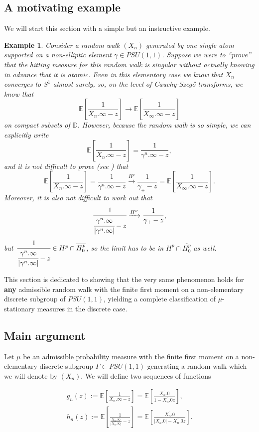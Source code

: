 \documentclass[11pt]{article}
\newtheorem{example}{Example}[section]
\begin{document}
\subsection{A motivating example}
We will start this section with a simple but an instructive example.
\begin{example}
	Consider a random walk $(X_n)$ generated by one single atom supported on a non-elliptic element $\gamma \in PSU(1,1)$. Suppose we were to ``prove'' that the hitting measure for this random walk is singular without actually knowing in advance that it is atomic. Even in this elementary case we know that $X_n$ converges to $S^1$ almost surely, so, on the level of Cauchy-Szeg\H{o} transforms, we know that 
	\[
	\mathbb{E}\left[\frac{1}{X_n.\infty - z}\right] \rightarrow \mathbb{E}\left[\frac{1}{X_\infty.\infty - z}\right]
	\]
	on compact subsets of $\mathbb{D}$. However, because the random walk is so simple, we can explicitly write
	\[
	\mathbb{E}\left[\frac{1}{X_n.\infty - z}\right] = \frac{1}{\gamma^n.\infty - z},
	\]
	and it is not difficult to prove (see \cite[Lemma 6.2.23]{cimahardy}) that
	\[
	\mathbb{E}\left[\frac{1}{X_n.\infty - z}\right] = \frac{1}{\gamma^n.\infty - z} \xrightarrow{H^p} \frac{1}{\gamma_+ - z} = \mathbb{E}\left[\frac{1}{X_\infty.\infty - z}\right].
	\]
	Moreover, it is also not difficult to work out that
	\[
	\cfrac{1}{\cfrac{\gamma^n.\infty}{|\gamma^n.\infty|} - z} \xrightarrow{H^p} \frac{1}{\gamma_+ - z},
	\]
	but $\cfrac{1}{\cfrac{\gamma^n.\infty}{|\gamma^n.\infty|} - z} \in H^p \cap \overline{H^p_0}$, so the limit has to be in $H^p \cap \overline{H^p_0}$ as well.
\end{example}

This section is dedicated to showing that the very same phenomenon holds for \textbf{any} admissible random walk with the finite first moment on a non-elementary discrete subgroup of $PSU(1,1)$, yielding a complete classification of $\mu$-stationary measures in the discrete case.

\subsection{Main argument}


Let $\mu$ be an admissible probability measure with the finite first moment on a non-elementary discrete subgroup $\Gamma \subset PSU(1,1)$ generating a random walk which we will denote by $(X_n)$. We will define two sequences of functions

\begin{gather}
	g_n(z) := \mathbb{E} \left[\frac{1}{X_n.\infty - z}\right] = \mathbb{E} \left[\frac{\overline{X_n.0}}{1 - \overline{X_n.0} z}\right], \\
	h_n(z) := \mathbb{E} \left[\frac{1}{\frac{X_n.\infty}{|X_n.\infty|} - z}\right] = \mathbb{E} \left[\frac{\overline{X_n.0}}{|X_n.0| - \overline{X_n.0} z}\right].
\end{gather}
\end{document}
